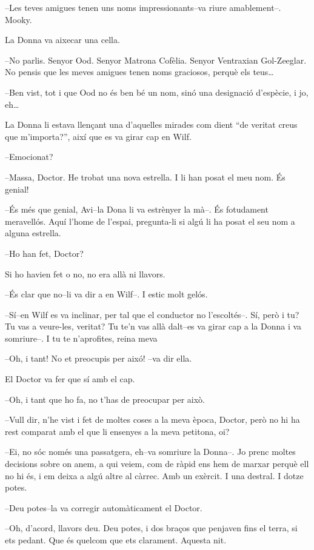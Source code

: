 --Les teves amigues tenen uns noms impressionants--va riure
amablement--. Mooky.

La Donna va aixecar una cella.

--No parlis. Senyor Ood. Senyor Matrona Cofèlia. Senyor Ventraxian
Gol-Zeeglar. No pensis que les meves amigues tenen noms graciosos,
perquè els teus\ldots{}

--Ben vist, tot i que Ood no és ben bé un nom, sinó una designació
d'espècie, i jo, eh\ldots{}

La Donna li estava llençant una d'aquelles mirades com dient ``de
veritat creus que m'importa?'', així que es va girar cap en Wilf.

--Emocionat?

--Massa, Doctor. He trobat una nova estrella. I li han posat el meu nom.
És genial!

--És més que genial, Avi--la Dona li va estrènyer la mà--. És fotudament
meravellós. Aquí l'home de l'espai, pregunta-li si algú li ha posat el
seu nom a alguna estrella.

--Ho han fet, Doctor?

Si ho havien fet o no, no era allà ni llavors.

--És clar que no--li va dir a en Wilf--. I estic molt gelós.

--Sí--en Wilf es va inclinar, per tal que el conductor no l'escoltés--.
Sí, però i tu? Tu vas a veure-les, veritat? Tu te'n vas allà dalt--es va
girar cap a la Donna i va somriure--. I tu te n'aprofites, reina meva

--Oh, i tant! No et preocupis per aixó! --va dir ella.

El Doctor va fer que sí amb el cap.

--Oh, i tant que ho fa, no t'has de preocupar per això.

--Vull dir, n'he vist i fet de moltes coses a la meva època, Doctor,
però no hi ha rest comparat amb el que li ensenyes a la meva petitona,
oi?

--Ei, no sóc només una passatgera, eh--va somriure la Donna--. Jo prenc
moltes decisions sobre on anem, a qui veiem, com de ràpid ens hem de
marxar perquè ell no hi és, i em deixa a algú altre al càrrec. Amb un
exèrcit. I una destral. I dotze potes.

--Deu potes--la va corregir automàticament el Doctor.

--Oh, d'acord, llavors deu. Deu potes, i dos braços que penjaven fins el
terra, si ets pedant. Que és quelcom que ets clarament. Aquesta nit.

